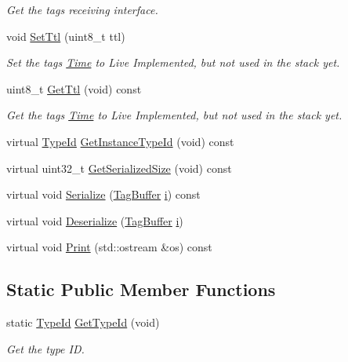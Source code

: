 \begin{DoxyCompactItemize}
\begin{DoxyCompactList}\small\item\em Get the tag\textquotesingle{}s receiving interface. \end{DoxyCompactList}\item 
void \hyperlink{classns3_1_1Ipv4PacketInfoTag_ab487034b85e40e0497f479cd1d2d3c06}{Set\+Ttl} (uint8\+\_\+t ttl)
\begin{DoxyCompactList}\small\item\em Set the tag\textquotesingle{}s \hyperlink{classns3_1_1Time}{Time} to Live Implemented, but not used in the stack yet. \end{DoxyCompactList}\item 
uint8\+\_\+t \hyperlink{classns3_1_1Ipv4PacketInfoTag_a8fe51c6f54c35346533a7debe82ec10d}{Get\+Ttl} (void) const 
\begin{DoxyCompactList}\small\item\em Get the tag\textquotesingle{}s \hyperlink{classns3_1_1Time}{Time} to Live Implemented, but not used in the stack yet. \end{DoxyCompactList}\item 
virtual \hyperlink{classns3_1_1TypeId}{Type\+Id} \hyperlink{classns3_1_1Ipv4PacketInfoTag_aee25555a2340cfbcc037819d258b8a81}{Get\+Instance\+Type\+Id} (void) const 
\item 
virtual uint32\+\_\+t \hyperlink{classns3_1_1Ipv4PacketInfoTag_a28ab6eff960d15031a5f9b66dc7b8b3f}{Get\+Serialized\+Size} (void) const 
\item 
virtual void \hyperlink{classns3_1_1Ipv4PacketInfoTag_aa55d4fb1e34964896369b4f95eb97374}{Serialize} (\hyperlink{classns3_1_1TagBuffer}{Tag\+Buffer} \hyperlink{lte__uplink__power__control_8m_a6f6ccfcf58b31cb6412107d9d5281426}{i}) const 
\item 
virtual void \hyperlink{classns3_1_1Ipv4PacketInfoTag_adba3c57ba7d242f8429b6e132192c116}{Deserialize} (\hyperlink{classns3_1_1TagBuffer}{Tag\+Buffer} \hyperlink{lte__uplink__power__control_8m_a6f6ccfcf58b31cb6412107d9d5281426}{i})
\item 
virtual void \hyperlink{classns3_1_1Ipv4PacketInfoTag_a1ace8bcbbe4f9e5e5256f8525e95fb61}{Print} (std\+::ostream \&os) const 
\end{DoxyCompactItemize}
\subsection*{Static Public Member Functions}
\begin{DoxyCompactItemize}
\item 
static \hyperlink{classns3_1_1TypeId}{Type\+Id} \hyperlink{classns3_1_1Ipv4PacketInfoTag_ae9b70a7603452c36a8ba83177b3ec8ae}{Get\+Type\+Id} (void)
\begin{DoxyCompactList}\small\item\em Get the type ID. \end{DoxyCompactList}\end{DoxyCompactItemize}
